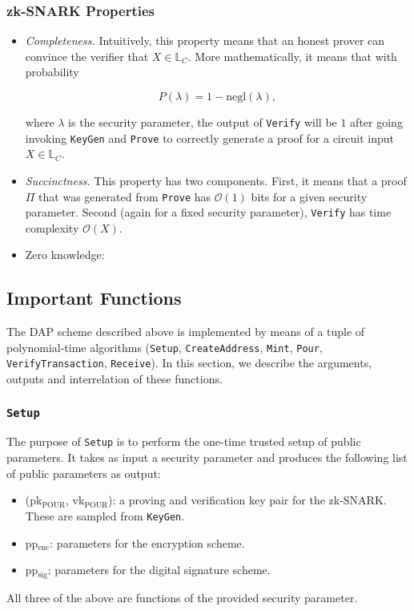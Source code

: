 \documentclass{article}
\begin{document}
\subsubsection{zk-SNARK Properties}
\begin{itemize}
\item \emph{Completeness.} Intuitively, this property means that an honest prover can convince the verifier that $X \in \mathbb{L}_C$. More mathematically, it means that with probability

\begin{equation}
P(\lambda) = 1 - \text{negl}(\lambda),
\end{equation}

where $\lambda$ is the security parameter, the output of \texttt{Verify} will be $1$ after going invoking \texttt{KeyGen} and \texttt{Prove} to correctly generate a proof for a circuit input $X \in \mathbb{L}_C$.

\item \emph{Succinctness.} This property has two components. First, it means that a proof $\Pi$ that was generated from \texttt{Prove} has $\mathcal{O}(1)$ bits for a given security parameter. Second (again for a fixed security parameter), \texttt{Verify} has time complexity $\mathcal{O}(X)$.

\item Zero knowledge:
\end{itemize}

\subsection{Important Functions}
The DAP scheme described above is implemented by means of a tuple of polynomial-time algorithms (\texttt{Setup}, \texttt{CreateAddress}, \texttt{Mint}, \texttt{Pour}, \texttt{VerifyTransaction}, \texttt{Receive}). In this section, we describe the arguments, outputs and interrelation of these functions.

\subsubsection{\texttt{Setup}}
The purpose of \texttt{Setup} is to perform the one-time trusted setup of public parameters. It takes as input a security parameter and produces the following list of public parameters as output:
\begin{itemize}
\item (pk$_{\text{POUR}}$, vk$_{\text{POUR}}$): a proving and verification key pair for the zk-SNARK. These are sampled from \texttt{KeyGen}.
\item pp$_{\text{enc}}$: parameters for the encryption scheme.
\item pp$_{\text{sig}}$: parameters for the digital signature scheme.
\end{itemize}
All three of the above are functions of the provided security parameter.
\end{document}
